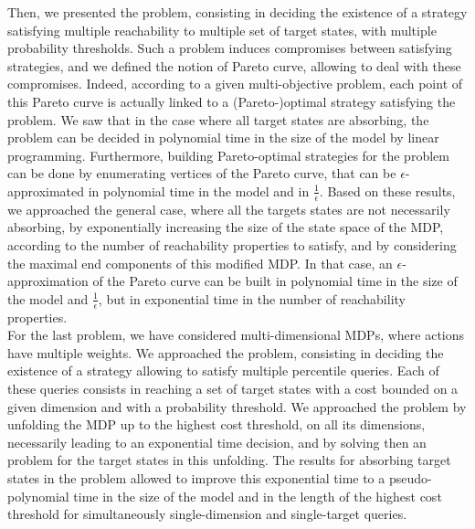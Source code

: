 Then, we presented the \MOSR{} problem, consisting in deciding the existence of a strategy satisfying multiple reachability to multiple set of target states, with multiple probability thresholds.
Such a problem induces compromises between satisfying strategies, and we defined the notion of Pareto curve, allowing to deal with these compromises.
Indeed, according to a given multi-objective problem, each point of this Pareto curve is actually linked to a (Pareto-)optimal strategy satisfying the problem.
We saw that in the case where all target states are absorbing, the problem can be decided in polynomial time in the size of the model by linear programming.
Furthermore, building Pareto-optimal strategies for the problem can be done by enumerating vertices of the Pareto curve, that can be $\epsilon$-approximated in polynomial time in the model and in $\frac{1}{\epsilon}$.
Based on these results, we approached the general case, where all the targets states are not necessarily absorbing, by exponentially increasing the size of the state space of the MDP, according to the number of reachability properties to satisfy, and by considering the maximal end components of this modified MDP.
In that case, an $\epsilon$-approximation of the Pareto curve can be built in polynomial time in the size of the model and $\frac{1}{\epsilon}$, but in exponential time in the number of reachability properties.\\

For the last problem, we have considered multi-dimensional MDPs, where actions have multiple weights.
We approached the \SSPPQ{} problem, consisting in deciding the existence of a strategy allowing to satisfy multiple percentile queries.
Each of these queries consists in reaching a set of target states with a cost bounded on a given dimension and with a probability threshold.
We approached the problem by unfolding the MDP up to the highest cost threshold, on all its dimensions, necessarily leading to an exponential time decision, and by solving then an \MOSR{} problem for the target states in this unfolding.
The results for absorbing target states in the \MOSR{} problem allowed to improve this exponential time to a pseudo-polynomial time in the size of the model and in the length of the highest cost threshold for simultaneously single-dimension and single-target queries.\\

